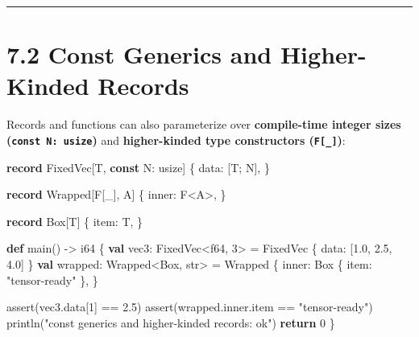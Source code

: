 \documentclass[
  english,
  oneside]{book}
\newenvironment{Shaded}{\begin{snugshade}}{\end{snugshade}}
\newcommand{\ControlFlowTok}[1]{\textcolor[rgb]{0.77,0.53,0.75}{\textbf{#1}}}
\newcommand{\DataTypeTok}[1]{\textcolor[rgb]{0.31,0.79,0.69}{#1}}
\newcommand{\DecValTok}[1]{\textcolor[rgb]{0.71,0.81,0.66}{#1}}
\newcommand{\FloatTok}[1]{\textcolor[rgb]{0.71,0.81,0.66}{#1}}
\newcommand{\FunctionTok}[1]{\textcolor[rgb]{0.86,0.86,0.67}{#1}}
\newcommand{\KeywordTok}[1]{\textcolor[rgb]{0.34,0.61,0.84}{\textbf{#1}}}
\newcommand{\NormalTok}[1]{\textcolor[rgb]{0.83,0.83,0.83}{#1}}
\newcommand{\OperatorTok}[1]{\textcolor[rgb]{0.83,0.83,0.83}{#1}}
\newcommand{\StringTok}[1]{\textcolor[rgb]{0.81,0.57,0.47}{#1}}
\begin{document}
\begin{center}\rule{0.5\linewidth}{0.5pt}\end{center}

\section{7.2 Const Generics and Higher-Kinded
Records}\label{const-generics-and-higher-kinded-records}

Records and functions can also parameterize over \textbf{compile-time
integer sizes (\texttt{const\ N:\ usize})} and \textbf{higher-kinded
type constructors (\texttt{F{[}\_{]}})}:

\begin{Shaded}
\begin{Highlighting}[]
\KeywordTok{record}\NormalTok{ FixedVec[T, }\KeywordTok{const}\NormalTok{ N: }\DataTypeTok{usize}\NormalTok{] \{}
\NormalTok{    data: [T; N],}
\NormalTok{\}}

\KeywordTok{record}\NormalTok{ Wrapped[F[\_], A] \{}
\NormalTok{    inner: F}\OperatorTok{\textless{}}\NormalTok{A}\OperatorTok{\textgreater{}}\NormalTok{,}
\NormalTok{\}}

\KeywordTok{record}\NormalTok{ Box[T] \{}
\NormalTok{    item: T,}
\NormalTok{\}}

\KeywordTok{def}\NormalTok{ main() }\OperatorTok{{-}\textgreater{}} \DataTypeTok{i64}\NormalTok{ \{}
    \KeywordTok{val}\NormalTok{ vec3: FixedVec}\OperatorTok{\textless{}}\DataTypeTok{f64}\NormalTok{, }\DecValTok{3}\OperatorTok{\textgreater{}} \OperatorTok{=}\NormalTok{ FixedVec \{ data: [}\FloatTok{1.0}\NormalTok{, }\FloatTok{2.5}\NormalTok{, }\FloatTok{4.0}\NormalTok{] \}}
    \KeywordTok{val}\NormalTok{ wrapped: Wrapped}\OperatorTok{\textless{}}\NormalTok{Box, }\DataTypeTok{str}\OperatorTok{\textgreater{}} \OperatorTok{=}\NormalTok{ Wrapped \{}
\NormalTok{        inner: Box \{ item: }\StringTok{"tensor{-}ready"}\NormalTok{ \},}
\NormalTok{    \}}

    \FunctionTok{assert}\NormalTok{(vec3}\OperatorTok{.}\NormalTok{data[}\DecValTok{1}\NormalTok{] }\OperatorTok{==} \FloatTok{2.5}\NormalTok{)}
    \FunctionTok{assert}\NormalTok{(wrapped}\OperatorTok{.}\NormalTok{inner}\OperatorTok{.}\NormalTok{item }\OperatorTok{==} \StringTok{"tensor{-}ready"}\NormalTok{)}
\NormalTok{    println(}\StringTok{"const generics and higher{-}kinded records: ok"}\NormalTok{)}
    \ControlFlowTok{return} \DecValTok{0}
\NormalTok{\}}
\end{Highlighting}
\end{Shaded}
\end{document}
